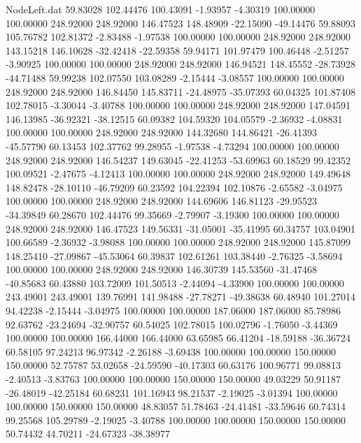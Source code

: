 \begin{filecontents}{NodeLeft.dat}
  59.83028  102.44476  100.43091    -1.93957   -4.30319  100.00000  100.00000  248.92000  248.92000  146.47523  148.48909  -22.15090  -49.14476
  59.88093  105.76782  102.81372    -2.83488   -1.97538  100.00000  100.00000  248.92000  248.92000  143.15218  146.10628  -32.42418  -22.59358
  59.94171  101.97479  100.46448    -2.51257   -3.90925  100.00000  100.00000  248.92000  248.92000  146.94521  148.45552  -28.73928  -44.71488
  59.99238  102.07550  103.08289    -2.15444   -3.08557  100.00000  100.00000  248.92000  248.92000  146.84450  145.83711  -24.48975  -35.07393
  60.04325  101.87408  102.78015    -3.30044   -3.40788  100.00000  100.00000  248.92000  248.92000  147.04591  146.13985  -36.92321  -38.12515
  60.09382  104.59320  104.05579    -2.36932   -4.08831  100.00000  100.00000  248.92000  248.92000  144.32680  144.86421  -26.41393  -45.57790
  60.13453  102.37762   99.28955    -1.97538   -4.73294  100.00000  100.00000  248.92000  248.92000  146.54237  149.63045  -22.41253  -53.69963
  60.18529   99.42352  100.09521    -2.47675   -4.12413  100.00000  100.00000  248.92000  248.92000  149.49648  148.82478  -28.10110  -46.79209
  60.23592  104.22394  102.10876    -2.65582   -3.04975  100.00000  100.00000  248.92000  248.92000  144.69606  146.81123  -29.95523  -34.39849
  60.28670  102.44476   99.35669    -2.79907   -3.19300  100.00000  100.00000  248.92000  248.92000  146.47523  149.56331  -31.05001  -35.41995
  60.34757  103.04901  100.66589    -2.36932   -3.98088  100.00000  100.00000  248.92000  248.92000  145.87099  148.25410  -27.09867  -45.53064
  60.39837  102.61261  103.38440    -2.76325   -3.58694  100.00000  100.00000  248.92000  248.92000  146.30739  145.53560  -31.47468  -40.85683
  60.43880  103.72009  101.50513    -2.44094   -4.33900  100.00000  100.00000  243.49001  243.49001  139.76991  141.98488  -27.78271  -49.38638
  60.48940  101.27014   94.42238    -2.15444   -3.04975  100.00000  100.00000  187.06000  187.06000   85.78986   92.63762  -23.24694  -32.90757
  60.54025  102.78015  100.02796    -1.76050   -3.44369  100.00000  100.00000  166.44000  166.44000   63.65985   66.41204  -18.59188  -36.36724
  60.58105   97.24213   96.97342    -2.26188   -3.69438  100.00000  100.00000  150.00000  150.00000   52.75787   53.02658  -24.59590  -40.17303
  60.63176  100.96771   99.08813    -2.40513   -3.83763  100.00000  100.00000  150.00000  150.00000   49.03229   50.91187  -26.48019  -42.25184
  60.68231  101.16943   98.21537    -2.19025   -3.01394  100.00000  100.00000  150.00000  150.00000   48.83057   51.78463  -24.41481  -33.59646
  60.74314   99.25568  105.29789    -2.19025   -3.40788  100.00000  100.00000  150.00000  150.00000   50.74432   44.70211  -24.67323  -38.38977

\end{filecontents}
